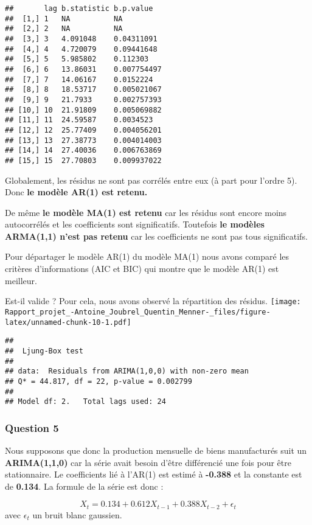\documentclass[
  landscape]{article}
\begin{document}
\begin{verbatim}
##       lag b.statistic b.p.value  
##  [1,] 1   NA          NA         
##  [2,] 2   NA          NA         
##  [3,] 3   4.091048    0.04311091 
##  [4,] 4   4.720079    0.09441648 
##  [5,] 5   5.985802    0.112303   
##  [6,] 6   13.86031    0.007754497
##  [7,] 7   14.06167    0.0152224  
##  [8,] 8   18.53717    0.005021067
##  [9,] 9   21.7933     0.002757393
## [10,] 10  21.91809    0.005069882
## [11,] 11  24.59587    0.0034523  
## [12,] 12  25.77409    0.004056201
## [13,] 13  27.38773    0.004014003
## [14,] 14  27.40036    0.006763869
## [15,] 15  27.70803    0.009937022
\end{verbatim}

Globalement, les résidus ne sont pas corrélés entre eux (à part pour
l'ordre 5). Donc \textbf{le modèle AR(1) est retenu.}

De même \textbf{le modèle MA(1) est retenu} car les résidus sont encore
moins autocorrélés et les coefficients sont significatifs. Toutefois
\textbf{le modèles ARMA(1,1) n'est pas retenu} car les coefficients ne
sont pas tous significatifs.

Pour départager le modèle AR(1) du modèle MA(1) nous avons comparé les
critères d'informations (AIC et BIC) qui montre que le modèle AR(1) est
meilleur.

Est-il valide ? Pour cela, nous avons observé la répartition des
résidus.
\texttt{[image: Rapport\_projet\_-Antoine\_Joubrel\_Quentin\_Menner-\_files/figure-latex/unnamed-chunk-10-1.pdf]}

\begin{verbatim}
## 
##  Ljung-Box test
## 
## data:  Residuals from ARIMA(1,0,0) with non-zero mean
## Q* = 44.817, df = 22, p-value = 0.002799
## 
## Model df: 2.   Total lags used: 24
\end{verbatim}

\hypertarget{question-5}{%
\subsubsection{Question 5}\label{question-5}}

Nous supposons que donc la production mensuelle de biens manufacturés
suit un \textbf{ARIMA(1,1,0)} car la série avait besoin d'être
différencié une fois pour être stationnaire. Le coefficients lié à
l'AR(1) est estimé à \textbf{-0.388} et la constante est de
\textbf{0.134}. La formule de la série est donc :

\[
X_t = 0.134 + 0.612X_{t-1} + 0.388X_{t-2} + \epsilon_t
\] avec \(\epsilon_t\) un bruit blanc gaussien.
\end{document}

